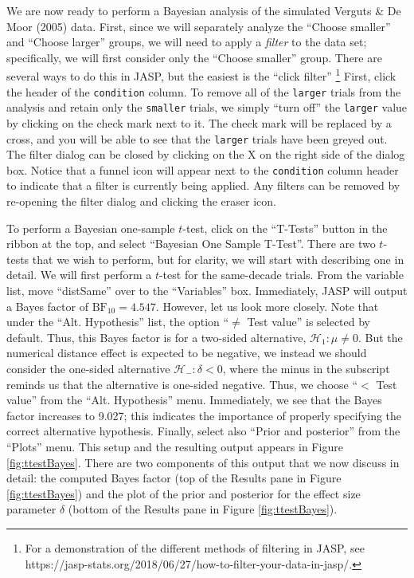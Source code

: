 \documentclass[english,,doc,floatsintext]{apa6}
\begin{document}
We are now ready to perform a Bayesian analysis of the simulated Verguts \& De Moor (2005) data. First, since we will separately analyze the \enquote{Choose smaller} and \enquote{Choose larger} groups, we will need to apply a \emph{filter} to the data set; specifically, we will first consider only the \enquote{Choose smaller} group. There are several ways to do this in JASP, but the easiest is the \enquote{click filter}
\footnote{For a demonstration of the different methods of filtering in JASP, see https://jasp-stats.org/2018/06/27/how-to-filter-your-data-in-jasp/.}
First, click the header of the \texttt{condition} column. To remove all of the \texttt{larger} trials from the analysis and retain only the \texttt{smaller} trials, we simply \enquote{turn off} the \texttt{larger} value by clicking on the check mark next to it. The check mark will be replaced by a cross, and you will be able to see that the \texttt{larger} trials have been greyed out. The filter dialog can be closed by clicking on the X on the right side of the dialog box. Notice that a funnel icon will appear next to the \texttt{condition} column header to indicate that a filter is currently being applied. Any filters can be removed by re-opening the filter dialog and clicking the eraser icon.

To perform a Bayesian one-sample \(t\)-test, click on the \enquote{T-Tests} button in the ribbon at the top, and select \enquote{Bayesian One Sample T-Test}. There are two \(t\)-tests that we wish to perform, but for clarity, we will start with describing one in detail. We will first perform a \(t\)-test for the same-decade trials. From the variable list, move \enquote{distSame} over to the \enquote{Variables} box. Immediately, JASP will output a Bayes factor of \(\text{BF}_{10}=4.547\). However, let us look more closely. Note that under the \enquote{Alt. Hypothesis} list, the option \enquote{\(\neq\) Test value} is selected by default. Thus, this Bayes factor is for a two-sided alternative, \(\mathcal{H}_1:\mu \neq 0\). But the numerical distance effect is expected to be negative, we instead we should consider the one-sided alternative \(\mathcal{H}_{-}:\delta < 0\), where the minus in the subscript reminds us that the alternative is one-sided negative. Thus, we choose \enquote{\(<\) Test value} from the \enquote{Alt. Hypothesis} menu. Immediately, we see that the Bayes factor increases to 9.027; this indicates the importance of properly specifying the correct alternative hypothesis. Finally, select also \enquote{Prior and posterior} from the \enquote{Plots} menu. This setup and the resulting output appears in Figure \ref{fig:ttestBayes}. There are two components of this output that we now discuss in detail: the computed Bayes factor (top of the Results pane in Figure \ref{fig:ttestBayes}) and the plot of the prior and posterior for the effect size parameter \(\delta\) (bottom of the Results pane in Figure \ref{fig:ttestBayes}).
\end{document}
